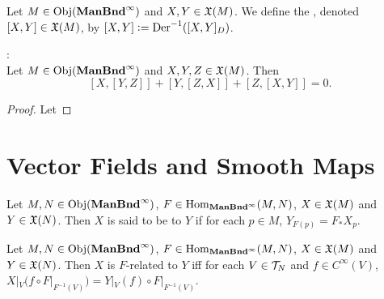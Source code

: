 \documentclass{book}
\begin{document}
\begin{defn}
	Let $M \in \operatorname{Obj}(\operatorname*{\text{\textbf{ManBnd}}^{\infty}})$ and $X,Y \in \mathfrak{X}(M)$. We define the , denoted $[X, Y] \in \mathfrak{X}(M)$, by $[X, Y] \vcentcolon= \text{Der}^{-1}([X, Y]_D)$.
\end{defn}

\begin{ex} : \\
	Let $M \in \operatorname{Obj}(\operatorname*{\text{\textbf{ManBnd}}^{\infty}})$ and $X,Y, Z \in \mathfrak{X}(M)$. Then 
	$$[X, [Y, Z]] + [Y, [Z, X]] + [Z, [X, Y]] = 0.$$
\end{ex}

\begin{proof}
	Let 
\end{proof}
























































\newpage
\section{Vector Fields and Smooth Maps}

\begin{defn}
	Let $M, N \in \operatorname{Obj}(\operatorname*{\text{\textbf{ManBnd}}^{\infty}})$, $F \in \operatorname{Hom}_{\operatorname*{\text{\textbf{ManBnd}}^{\infty}}}(M, N)$, $X \in \mathfrak{X}(M)$ and $Y \in \mathfrak{X}(N)$. Then $X$ is said to be  to $Y$ if for each $p \in M$, $Y_{F(p)} = F_*X_p$.
\end{defn}

\begin{ex}
	Let $M, N \in \operatorname{Obj}(\operatorname*{\text{\textbf{ManBnd}}^{\infty}})$, $F \in \operatorname{Hom}_{\operatorname*{\text{\textbf{ManBnd}}^{\infty}}}(M, N)$, $X \in \mathfrak{X}(M)$ and $Y \in \mathfrak{X}(N)$. Then $X$ is $F$-related to $Y$ iff for each $V \in \mathcal{T}_N$ and $f \in C^{\infty}(V)$, $X|_V(f \circ F|_{F^{-1}(V)}) = Y|_V(f) \circ F|_{F^{-1}(V)}$. 
\end{ex}
\end{document}
